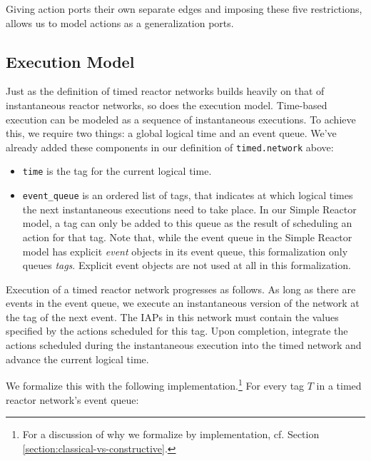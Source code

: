 \noindent Giving action ports their own separate edges and imposing these five restrictions, allows us to model actions as a generalization ports.

\subsection{Execution Model}
\label{section:timed-exec-model}

Just as the definition of timed reactor networks builds heavily on that of instantaneous reactor networks, so does the execution model.
Time-based execution can be modeled as a sequence of instantaneous executions. 
To achieve this, we require two things: a global logical time and an event queue.
We've already added these components in our definition of \lstinline{timed.network} above:

\begin{itemize}
  \item \lstinline{time} is the tag for the current logical time.
  \item \lstinline{event_queue} is an ordered list of tags, that indicates at which logical times the next instantaneous executions need to take place.
  In our Simple Reactor model, a tag can only be added to this queue as the result of scheduling an action for that tag.
  Note that, while the event queue in the Simple Reactor model has explicit \emph{event} objects in its event queue, this formalization only queues \emph{tags}.
  Explicit event objects are not used at all in this formalization.
\end{itemize}

\noindent Execution of a timed reactor network progresses as follows.
As long as there are events in the event queue, we execute an instantaneous version of the network at the tag of the next event.
The IAPs in this network must contain the values specified by the actions scheduled for this tag.
Upon completion, integrate the actions scheduled during the instantaneous execution into the timed network and advance the current logical time.

\noindent We formalize this with the following implementation.\footnote{For a discussion of why we formalize by implementation, cf. Section \ref{section:classical-vs-constructive}.}
For every tag $T$ in a timed reactor network's event queue:

